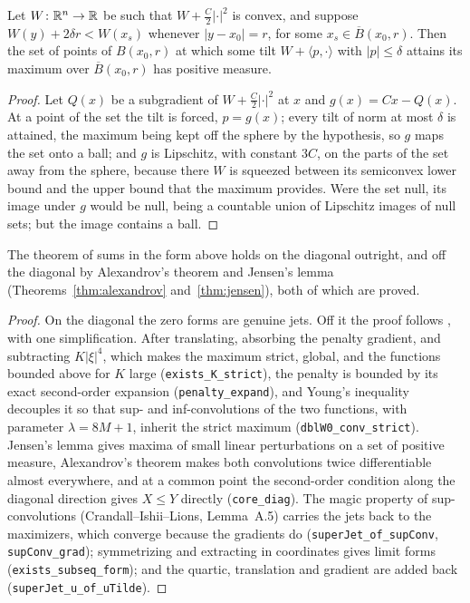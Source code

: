 \begin{theorem}\label{thm:jensen}
\leanok
Let $W\colon \mathbb{R}^n \to \mathbb{R}$ be such that $W + \tfrac C2 |\cdot|^2$ is convex, and
suppose $W(y) + 2\delta r < W(x_s)$ whenever $|y - x_0| = r$, for some
$x_s \in \overline B(x_0, r)$. Then the set of points of $B(x_0, r)$ at which
some tilt $W + \langle p, \cdot\rangle$ with $|p| \le \delta$ attains its
maximum over $\overline B(x_0, r)$ has positive measure.
\end{theorem}

\begin{proof}
\leanok
Let $Q(x)$ be a subgradient of $W + \tfrac C2|\cdot|^2$ at $x$ and
$g(x) = Cx - Q(x)$. At a point of the set the tilt is forced, $p = g(x)$; every
tilt of norm at most $\delta$ is attained, the maximum being kept off the sphere
by the hypothesis, so $g$ maps the set onto a ball; and $g$ is Lipschitz, with
constant $3C$, on the parts of the set away from the sphere, because there $W$
is squeezed between its semiconvex lower bound and the upper bound that the
maximum provides. Were the set null, its image under $g$ would be null, being a
countable union of Lipschitz images of null sets; but the image contains a
ball.
\end{proof}


\begin{theorem}\label{thm:sums}
\leanok
The theorem of sums in the form above holds on the diagonal outright, and off
the diagonal by Alexandrov's theorem and Jensen's lemma
(Theorems~\ref{thm:alexandrov} and~\ref{thm:jensen}), both of which are proved.
\end{theorem}

\begin{proof}
\leanok
{}
On the diagonal the zero forms are genuine jets. Off it the proof follows ,
with one simplification. After translating, absorbing the penalty gradient, and
subtracting $K|\xi|^4$, which makes the maximum strict, global, and the functions
bounded above for $K$ large (\texttt{exists\_K\_strict}), the penalty is
bounded by its exact second-order expansion (\texttt{penalty\_expand}), and
Young's inequality decouples it so that sup- and inf-convolutions of the two
functions, with parameter $\lambda = 8M + 1$, inherit the strict maximum
(\texttt{dblW0\_conv\_strict}). Jensen's lemma gives maxima of small linear
perturbations on a set of positive measure, Alexandrov's theorem makes both
convolutions twice differentiable almost everywhere, and at a common point the
second-order condition along the diagonal direction gives $X \le Y$ directly
(\texttt{core\_diag}). The magic property of
sup-convolutions (Crandall--Ishii--Lions, Lemma~A.5) carries the jets back to the
maximizers, which converge because the gradients do
(\texttt{superJet\_of\_supConv}, \texttt{supConv\_grad}); symmetrizing and
extracting in coordinates gives limit forms (\texttt{exists\_subseq\_form});
and the quartic, translation and gradient are added back
(\texttt{superJet\_u\_of\_uTilde}).
\end{proof}


